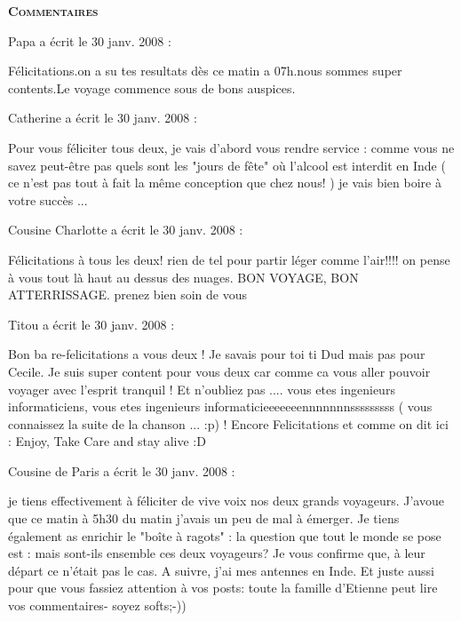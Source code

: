 \bigskip
\textbf{\textsc{Commentaires}}

\medskip
Papa a écrit le 30 janv. 2008 :
\begin{displayquote}
Félicitations.on a su tes resultats dès ce matin a 07h.nous sommes super contents.Le voyage commence sous de bons auspices.
\end{displayquote}

\medskip
Catherine a écrit le 30 janv. 2008 :
\begin{displayquote}
Pour vous féliciter tous deux, je vais d'abord vous rendre service : comme vous ne savez peut-être pas quels sont les "jours de fête" où l'alcool est interdit en Inde ( ce n'est pas tout à fait la même conception que chez nous! ) je vais bien boire à votre succès ...
\end{displayquote}

\medskip
Cousine Charlotte a écrit le 30 janv. 2008 :
\begin{displayquote}
Félicitations à tous les deux! rien de tel pour partir léger comme l'air!!!! on pense à vous tout là haut au dessus des nuages. BON VOYAGE, BON ATTERRISSAGE. prenez bien soin de vous
\end{displayquote}

\medskip
Titou a écrit le 30 janv. 2008 :
\begin{displayquote}
Bon ba re-felicitations a vous deux ! Je savais pour toi ti Dud mais pas pour Cecile. Je suis super content pour vous deux car comme ca vous aller pouvoir voyager avec l'esprit tranquil ! Et n'oubliez pas .... vous etes ingenieurs informaticiens, vous etes ingenieurs informaticieeeeeeennnnnnnsssssssss ( vous connaissez la suite de la chanson ... :p) ! Encore Felicitations et comme on dit ici : Enjoy, Take Care and stay alive :D
\end{displayquote}

\medskip
Cousine de Paris a écrit le 30 janv. 2008 :
\begin{displayquote}
je tiens effectivement à féliciter de vive voix nos deux grands voyageurs. J'avoue que ce matin à 5h30 du matin j'avais un peu de mal à émerger.
Je tiens également as enrichir le "boîte à ragots" : la question que tout le monde se pose est : mais sont-ils ensemble ces deux voyageurs? Je vous confirme que, à leur départ ce n'était pas le cas. A suivre, j'ai mes antennes en Inde.
Et juste aussi pour que vous fassiez attention à vos posts: toute la famille d'Etienne peut lire vos commentaires- soyez softs;-))
\end{displayquote}

